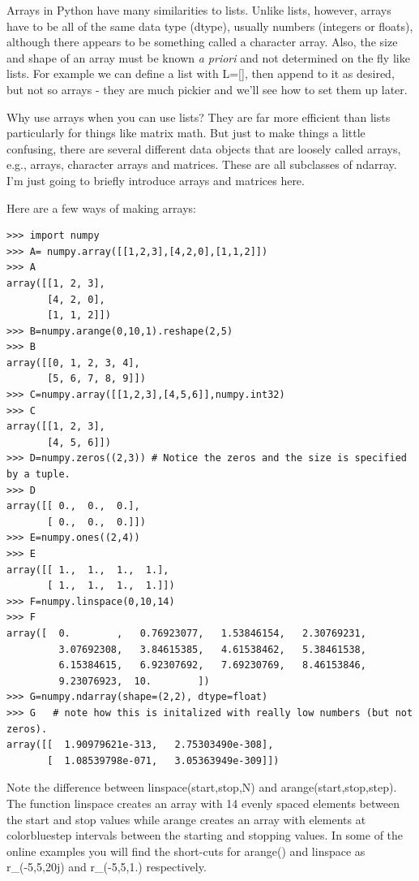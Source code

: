 \documentclass[11pt]{book}
\begin{document}
{{Arrays  in Python  have many similarities  to  lists.
Unlike lists, however,  arrays have to be all of the same data type (dtype), usually numbers (integers or floats), although there appears to be something called a character array.  Also, the size and shape of an array must be known {\it a priori} and not determined on the fly like lists. For example we can define a list with {\color{blue}L=[]}, then append to it as desired, but not so arrays - they are much pickier and we'll see how to set them up later.

Why use arrays when you can use lists?  They are far more efficient than lists particularly for things like matrix math.   But just to make things a little confusing, there are  several different data objects that are loosely called arrays, e.g., arrays, character arrays and matrices.  These are all subclasses of ndarray.  I'm just going to briefly introduce arrays and matrices here.

 Here are a few ways of making arrays:
{ \color{blue} \begin{verbatim}
>>> import numpy
>>> A= numpy.array([[1,2,3],[4,2,0],[1,1,2]])
>>> A
array([[1, 2, 3],
       [4, 2, 0],
       [1, 1, 2]])
>>> B=numpy.arange(0,10,1).reshape(2,5)
>>> B
array([[0, 1, 2, 3, 4],
       [5, 6, 7, 8, 9]])
>>> C=numpy.array([[1,2,3],[4,5,6]],numpy.int32)
>>> C
array([[1, 2, 3],
       [4, 5, 6]])
>>> D=numpy.zeros((2,3)) # Notice the zeros and the size is specified by a tuple.
>>> D
array([[ 0.,  0.,  0.],
       [ 0.,  0.,  0.]])
>>> E=numpy.ones((2,4))
>>> E
array([[ 1.,  1.,  1.,  1.],
       [ 1.,  1.,  1.,  1.]])
>>> F=numpy.linspace(0,10,14)
>>> F
array([  0.        ,   0.76923077,   1.53846154,   2.30769231,
         3.07692308,   3.84615385,   4.61538462,   5.38461538,
         6.15384615,   6.92307692,   7.69230769,   8.46153846,
         9.23076923,  10.        ])
>>> G=numpy.ndarray(shape=(2,2), dtype=float)
>>> G   # note how this is initalized with really low numbers (but not zeros).
array([[  1.90979621e-313,   2.75303490e-308],
       [  1.08539798e-071,   3.05363949e-309]])
\end{verbatim}}

Note the difference between {\color{blue}linspace(start,stop,N)} and {\color{blue}arange(start,stop,step)}. The function {\color{blue}linspace} creates an array with 14 evenly spaced elements between the start and stop values while  {\color{blue}arange} creates an array with elements at {color{blue}step} intervals between the starting and stopping values.    In some of the online examples you will find the short-cuts for {\color{blue}arange()} and {\color{blue}linspace} as  {\color{blue}r\_(-5,5,20j)} and {\color{blue}r\_(-5,5,1.)} respectively.

}}
\end{document}

